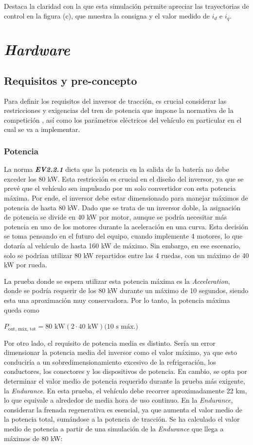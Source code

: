 Destaca la claridad con la que esta simulación permite apreciar las trayectorias de control en la figura (c), que muestra la consigna y el valor medido de $i_d$ e $i_q$.



\section{\textit{Hardware}}

\subsection{Requisitos y pre-concepto}

Para definir los requisitos del inversor de tracción, es crucial considerar las restricciones y exigencias del tren de potencia que impone la normativa de la competición \cite{FSG}, así como los parámetros eléctricos del vehículo en particular en el cual se va a implementar.

\subsubsection{Potencia}
La norma \textit{\textbf{EV2.2.1}} dicta que la potencia en la salida de la batería no debe exceder los 80 kW. Esta restricción es crucial en el diseño del inversor, ya que se prevé que el vehículo sea impulsado por un solo convertidor con esta potencia máxima. Por ende, el inversor debe estar dimensionado para manejar máximos de potencia de hasta 80 kW. Dado que se trata de un inversor doble, la asignación de potencia se divide en 40 kW por motor, aunque se podría necesitar más potencia en uno de los motores durante la aceleración en una curva. Esta decisión se toma pensando en el futuro del equipo, cuando implemente 4 motores, lo que dotaría al vehículo de hasta 160 kW de máximo. Sin embargo, en ese escenario, solo se podrían utilizar 80 kW repartidos entre las 4 ruedas, con un máximo de 40 kW por rueda.

La prueba donde se espera utilizar esta potencia máxima es la \textit{Acceleration}, donde se podría requerir de los 80 kW durante un máximo de 10 segundos, siendo esta una aproximación muy conservadora. Por lo tanto, la potencia máxima queda como

\(P_{\text{out, máx, tot}} = 80 \text{ kW} (2 \cdot 40 \text{ kW}) \text{(10 s máx.)}\)


Por otro lado, el requisito de potencia media es distinto. Sería un error dimensionar la potencia media del inversor como el valor máximo, ya que esto conduciría a un sobredimensionamiento excesivo de la refrigeración, los conductores, los conectores y los dispositivos de potencia. En cambio, se opta por determinar el valor medio de potencia requerido durante la prueba más exigente, la \textit{Endurance}. En esta prueba, el vehículo debe recorrer aproximadamente 22 km, lo que equivale a alrededor de media hora de uso continuo. En la \textit{Endurance}, considerar la frenada regenerativa es esencial, ya que aumenta el valor medio de la potencia total, sumándose a la potencia de tracción. Se ha calculado el valor medio de potencia a partir de una simulación de la \textit{Endurance} que llega a máximos de 80 kW:

